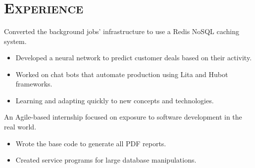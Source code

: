 \begin{resume}
\begin{formatb}
  \\
  \\
  \body\\
\end{formatb}

\section{\textsc{Experience}}
\begin{position}
  Converted the background jobs' infrastructure to use a Redis NoSQL caching system.
\begin{itemize}
\item Developed a neural network to predict customer deals based on their activity.
\end{itemize}
\begin{itemize}
\item Worked on chat bots that automate production using Lita and Hubot frameworks.
\end{itemize}
\begin{itemize}
\item Learning and adapting quickly to new concepts and technologies.
\end{itemize}
\end{position}

\begin{position}
  An Agile-based internship focused on exposure to software development in the real world. 
\begin{itemize}
\item Wrote the base code to generate all PDF reports.
\end{itemize}
\begin{itemize}
\item Created service programs for large database manipulations.
\end{itemize}
\end{position}


\end{resume}

